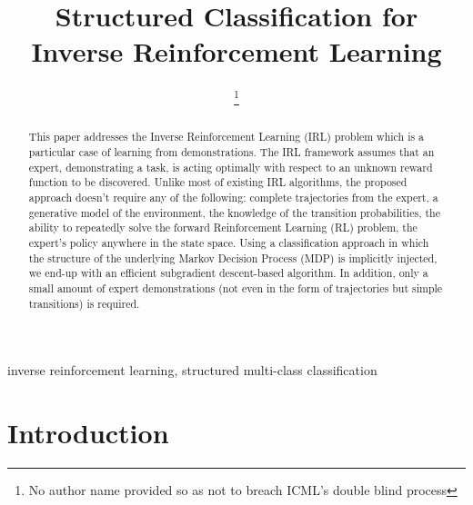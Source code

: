 \documentclass[tablecaption=bottom]{jmlr}
\title[SCIRL]{Structured Classification for Inverse Reinforcement Learning}
\author{\Name{Paper under review at ICML}\thanks{No author name provided so as not to breach ICML's double blind process}}
\begin{document}
\maketitle

\begin{abstract}
This paper addresses the Inverse Reinforcement Learning (IRL)
problem which is a particular case of learning from demonstrations.
The IRL framework assumes that an expert, demonstrating a task, is
acting optimally with respect to an unknown reward function to be
discovered. Unlike most of existing IRL algorithms, the proposed
approach doesn't require any of the following: complete trajectories
from the expert, a generative model of the environment, the
knowledge of the transition probabilities, the ability to repeatedly
solve the forward Reinforcement Learning (RL) problem, the expert's
policy anywhere in the state space. Using a classification approach
in which the structure of the underlying Markov Decision Process
(MDP) is implicitly injected, we end-up with an efficient
subgradient descent-based algorithm.
In addition, only a small amount of expert
demonstrations (not even in the form of trajectories but simple
transitions) is required.
\end{abstract}
\begin{keywords}
inverse reinforcement learning, structured multi-class
classification
\end{keywords}

\section{Introduction}
\end{document}
